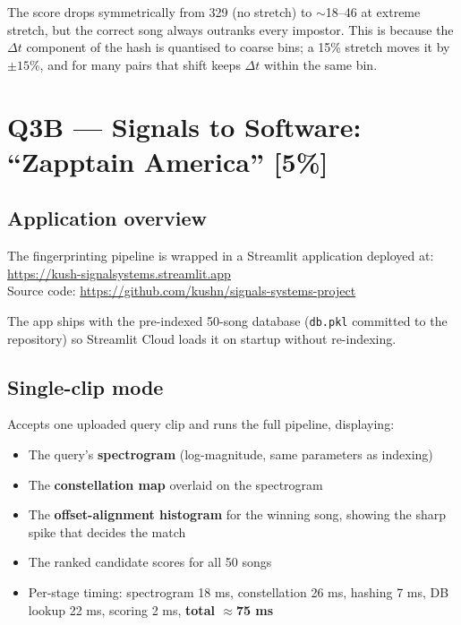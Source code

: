 \documentclass[11pt,a4paper]{article}
\begin{document}
The score drops symmetrically from 329 (no stretch) to $\sim$18–46 at extreme
stretch, but the correct song always outranks every impostor. This is because the
$\Delta t$ component of the hash is quantised to coarse bins; a 15\% stretch moves
it by $\pm 15\%$, and for many pairs that shift keeps $\Delta t$ within the same bin.

\section{Q3B — Signals to Software: ``Zapptain America'' [5\%]}

\subsection{Application overview}

The fingerprinting pipeline is wrapped in a Streamlit application deployed at:\\
\url{https://kush-signalsystems.streamlit.app}\\
Source code: \url{https://github.com/kushn/signals-systems-project}

The app ships with the pre-indexed 50-song database (\texttt{db.pkl} committed
to the repository) so Streamlit Cloud loads it on startup without re-indexing.

\subsection{Single-clip mode}

Accepts one uploaded query clip and runs the full pipeline, displaying:
\begin{itemize}[noitemsep]
  \item The query's \textbf{spectrogram} (log-magnitude, same parameters as indexing)
  \item The \textbf{constellation map} overlaid on the spectrogram
  \item The \textbf{offset-alignment histogram} for the winning song, showing the
        sharp spike that decides the match
  \item The ranked candidate scores for all 50 songs
  \item Per-stage timing: spectrogram 18 ms, constellation 26 ms, hashing 7 ms,
        DB lookup 22 ms, scoring 2 ms, \textbf{total $\approx$75 ms}
\end{itemize}
\end{document}
